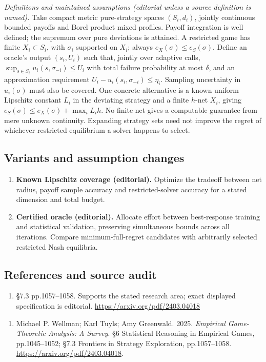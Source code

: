 \documentclass[11pt,a4paper]{article}
\begin{document}
\emph{Definitions and maintained assumptions (editorial unless a source definition is named).} Take compact metric pure-strategy spaces \((S_i,d_i)\), jointly continuous bounded payoffs and Borel product mixed profiles. Payoff integration is well defined; the supremum over pure deviations is attained. A restricted game has finite \(X_i\subset S_i\), with \(\sigma_i\) supported on \(X_i\); always \(e_X(\sigma)\le e_S(\sigma)\). Define an oracle’s output \((s_i,U_i)\) such that, jointly over adaptive calls, \(\sup_{s\in S_i}u_i(s,\sigma_{-i})\le U_i\) with total failure probability at most \(\delta\), and an approximation requirement \(U_i-u_i(s_i,\sigma_{-i})\le\eta_i\). Sampling uncertainty in \(u_i(\sigma)\) must also be covered. One concrete alternative is a known uniform Lipschitz constant \(L_i\) in the deviating strategy and a finite \(h\)-net \(X_i\), giving \(e_S(\sigma)\le e_X(\sigma)+\max_iL_i h\). No finite net gives a computable guarantee from mere unknown continuity. Expanding strategy sets need not improve the regret of whichever restricted equilibrium a solver happens to select.
\subsection*{Variants and assumption changes}
\begin{enumerate}
\item \textbf{Known Lipschitz coverage (editorial).} Optimize the tradeoff between net radius, payoff sample accuracy and restricted-solver accuracy for a stated dimension and total budget.
\item \textbf{Certified oracle (editorial).} Allocate effort between best-response training and statistical validation, preserving simultaneous bounds across all iterations. Compare minimum-full-regret candidates with arbitrarily selected restricted Nash equilibria.
\end{enumerate}
\subsection*{References and source audit}
\begin{enumerate}
\item §7.3 pp.1057–1058. Supports the stated research area; exact displayed specification is editorial. \url{https://arxiv.org/pdf/2403.04018}
\end{enumerate}
\begin{enumerate}\raggedright
\item\hypertarget{definitions:source:30007571:1}{} Michael P. Wellman; Karl Tuyls; Amy Greenwald. 2025. \emph{Empirical Game-Theoretic Analysis: A Survey}. §6 Statistical Reasoning in Empirical Games, pp.1045–1052; §7.3 Frontiers in Strategy Exploration, pp.1057–1058.
\url{https://arxiv.org/pdf/2403.04018}.
\end{enumerate}
\end{document}
